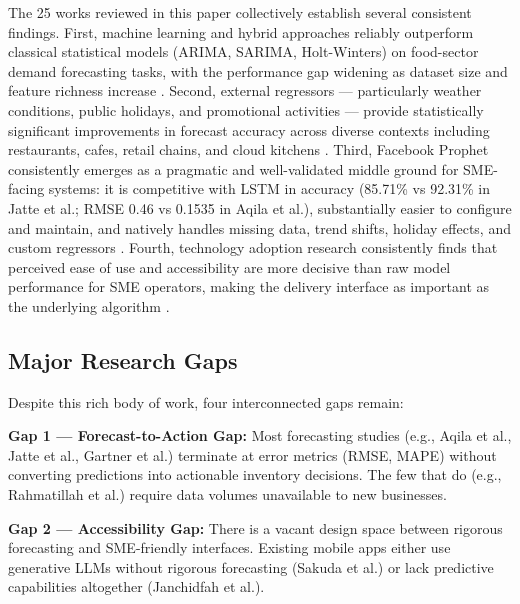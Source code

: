 \documentclass[conference]{IEEEtran}
\begin{document}
The 25 works reviewed in this paper collectively establish several
consistent findings. First, machine learning and hybrid approaches
reliably outperform classical statistical models (ARIMA, SARIMA,
Holt-Winters) on food-sector demand forecasting tasks, with the
performance gap widening as dataset size and feature richness increase
\cite{gartner2024, ganguly2024, jatte2025}. Second, external regressors
--- particularly weather conditions, public holidays, and promotional
activities --- provide statistically significant improvements in forecast
accuracy across diverse contexts including restaurants, cafes, retail
chains, and cloud kitchens \cite{guler, kamboj2025, groene_zakharov,
lalitha2025, jain2024, qureshi2024}. Third, Facebook Prophet consistently
emerges as a pragmatic and well-validated middle ground for SME-facing
systems: it is competitive with LSTM in accuracy (85.71\% vs 92.31\%
in Jatte et al.; RMSE 0.46 vs 0.1535 in Aqila et al.), substantially
easier to configure and maintain, and natively handles missing data,
trend shifts, holiday effects, and custom regressors \cite{jatte2025,
aqila2026, kamboj2025, guler}. Fourth, technology adoption research
consistently finds that perceived ease of use and accessibility are
more decisive than raw model performance for SME operators, making the
delivery interface as important as the underlying algorithm
\cite{yuniarty2025, janchidfah2026, aree2025}.

\subsection{Major Research Gaps}

Despite this rich body of work, four interconnected gaps remain:

\textbf{Gap 1 --- Forecast-to-Action Gap:} Most forecasting studies 
(e.g., Aqila et al., Jatte et al., Gartner et al.) terminate at error 
metrics (RMSE, MAPE) without converting predictions into actionable 
inventory decisions. The few that do (e.g., Rahmatillah et al.) require 
data volumes unavailable to new businesses.

\textbf{Gap 2 --- Accessibility Gap:} There is a vacant design space 
between rigorous forecasting and SME-friendly interfaces. Existing mobile 
apps either use generative LLMs without rigorous forecasting (Sakuda et al.) 
or lack predictive capabilities altogether (Janchidfah et al.).
\end{document}
